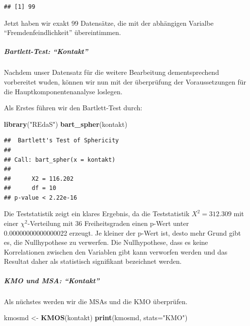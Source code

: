 \documentclass[]{article}
\newenvironment{Shaded}{\begin{snugshade}}{\end{snugshade}}
\newcommand{\KeywordTok}[1]{\textcolor[rgb]{0.13,0.29,0.53}{\textbf{{#1}}}}
\newcommand{\DataTypeTok}[1]{\textcolor[rgb]{0.13,0.29,0.53}{{#1}}}
\newcommand{\StringTok}[1]{\textcolor[rgb]{0.31,0.60,0.02}{{#1}}}
\newcommand{\NormalTok}[1]{{#1}}
\let\oldsubparagraph\subparagraph
\renewcommand{\subparagraph}[1]{\oldsubparagraph{#1}\mbox{}}
\begin{document}
\begin{verbatim}
## [1] 99
\end{verbatim}

Jetzt haben wir exakt 99 Datensätze, die mit der abhängigen Varialbe
``Fremdenfeindlichkeit'' übereintimmen.

\subparagraph{\texorpdfstring{Bartlett-Test:
``Kontakt''}{Bartlett-Test: Kontakt}}\label{bartlett-test-kontakt}

Nachdem unser Datensatz für die weitere Bearbeitung dementsprechend
vorbereitet wuden, können wir nun mit der überprüfung der
Voraussetzungen für die Hauptkomponentenanalyse loslegen.

Als Erstes führen wir den Bartlett-Test durch:

\begin{Shaded}
\begin{Highlighting}[]
\KeywordTok{library}\NormalTok{(}\StringTok{"REdaS"}\NormalTok{)}
\KeywordTok{bart_spher}\NormalTok{(kontakt)}
\end{Highlighting}
\end{Shaded}

\begin{verbatim}
##  Bartlett's Test of Sphericity
## 
## Call: bart_spher(x = kontakt)
## 
##      X2 = 116.202
##      df = 10
## p-value < 2.22e-16
\end{verbatim}

Die Teststatistik zeigt ein klares Ergebnis, da die Teststatistik
\(X^2=312.309\) mit einer \(\chi^2\)-Verteilung mit 36 Freiheitsgraden
einen p-Wert unter 0.00000000000000022 erzeugt. Je kleiner der p-Wert
ist, desto mehr Grund gibt es, die Nullhypothese zu verwerfen. Die
Nullhypothese, dass es keine Korrelationen zwischen den Variablen gibt
kann verworfen werden und das Resultat daher als statistisch signifikant
bezeichnet werden.

\subparagraph{\texorpdfstring{KMO und MSA:
``Kontakt''}{KMO und MSA: Kontakt}}\label{kmo-und-msa-kontakt}

Als nüchstes werden wir die MSAs und die KMO überprüfen.

\begin{Shaded}
\begin{Highlighting}[]
\NormalTok{kmosmd <-}\StringTok{ }\KeywordTok{KMOS}\NormalTok{(kontakt)}
\KeywordTok{print}\NormalTok{(kmosmd, }\DataTypeTok{stats=}\StringTok{"KMO"}\NormalTok{)}
\end{Highlighting}
\end{Shaded}
\end{document}
